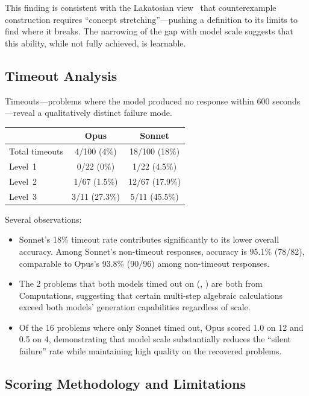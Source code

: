 This finding is consistent with the Lakatosian view~\citep{lakatos1976proofs} that counterexample construction requires ``concept stretching''---pushing a definition to its limits to find where it breaks.
The narrowing of the gap with model scale suggests that this ability, while not fully achieved, is learnable.

\subsection{Timeout Analysis}
\label{sec:timeout-analysis}

Timeouts---problems where the model produced no response within 600 seconds---reveal a qualitatively distinct failure mode.

\begin{center}
\begin{tabular}{lcc}
\toprule
& \textbf{Opus} & \textbf{Sonnet} \\
\midrule
Total timeouts & 4/100 (4\%) & 18/100 (18\%) \\
Level~1 & 0/22 (0\%) & 1/22 (4.5\%) \\
Level~2 & 1/67 (1.5\%) & 12/67 (17.9\%) \\
Level~3 & 3/11 (27.3\%) & 5/11 (45.5\%) \\
\bottomrule
\end{tabular}
\end{center}

Several observations:
\begin{itemize}[nosep]
  \item Sonnet's 18\% timeout rate contributes significantly to its lower overall accuracy. Among Sonnet's non-timeout responses, accuracy is 95.1\% (78/82), comparable to Opus's 93.8\% (90/96) among non-timeout responses.
  \item The 2 problems that both models timed out on (, ) are both from Computations, suggesting that certain multi-step algebraic calculations exceed both models' generation capabilities regardless of scale.
  \item Of the 16 problems where only Sonnet timed out, Opus scored 1.0 on 12 and 0.5 on 4, demonstrating that model scale substantially reduces the ``silent failure'' rate while maintaining high quality on the recovered problems.
\end{itemize}

\subsection{Scoring Methodology and Limitations}
\label{sec:self-eval-limitations}

